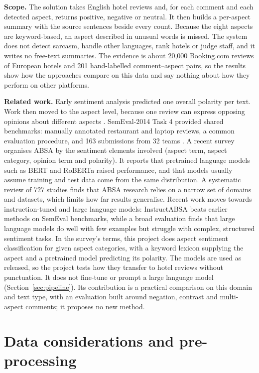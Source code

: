 \documentclass[11pt,a4paper]{article}
\begin{document}
\textbf{Scope.} The solution takes English hotel reviews and, for each comment and each detected aspect, returns positive, negative or neutral. It then builds a per-aspect summary with the source sentences beside every count. Because the eight aspects are keyword-based, an aspect described in unusual words is missed. The system does not detect sarcasm, handle other languages, rank hotels or judge staff, and it writes no free-text summaries. The evidence is about 20,000 Booking.com reviews of European hotels and 201 hand-labelled comment--aspect pairs, so the results show how the approaches compare on this data and say nothing about how they perform on other platforms.

\textbf{Related work.} Early sentiment analysis predicted one overall polarity per text. Work then moved to the aspect level, because one review can express opposing opinions about different aspects \cite{pontiki2014}. SemEval-2014 Task 4 provided shared benchmarks: manually annotated restaurant and laptop reviews, a common evaluation procedure, and 163 submissions from 32 teams \cite{pontiki2014}. A recent survey \cite{zhang2022} organises ABSA by the sentiment elements involved (aspect term, aspect category, opinion term and polarity). It reports that pretrained language models such as BERT and RoBERTa raised performance, and that models usually assume training and test data come from the same distribution. A systematic review of 727 studies \cite{hua2024} finds that ABSA research relies on a narrow set of domains and datasets, which limits how far results generalise. Recent work moves towards instruction-tuned and large language models: InstructABSA \cite{scaria2024} beats earlier methods on SemEval benchmarks, while a broad evaluation \cite{zhang2024} finds that large language models do well with few examples but struggle with complex, structured sentiment tasks. In the survey's terms, this project does aspect sentiment classification for given aspect categories, with a keyword lexicon supplying the aspect and a pretrained model predicting its polarity. The models are used as released, so the project tests how they transfer to hotel reviews without punctuation. It does not fine-tune or prompt a large language model (Section~\ref{sec:pipeline}). Its contribution is a practical comparison on this domain and text type, with an evaluation built around negation, contrast and multi-aspect comments; it proposes no new method.

\section{Data considerations and pre-processing}\label{sec:data}
\end{document}
